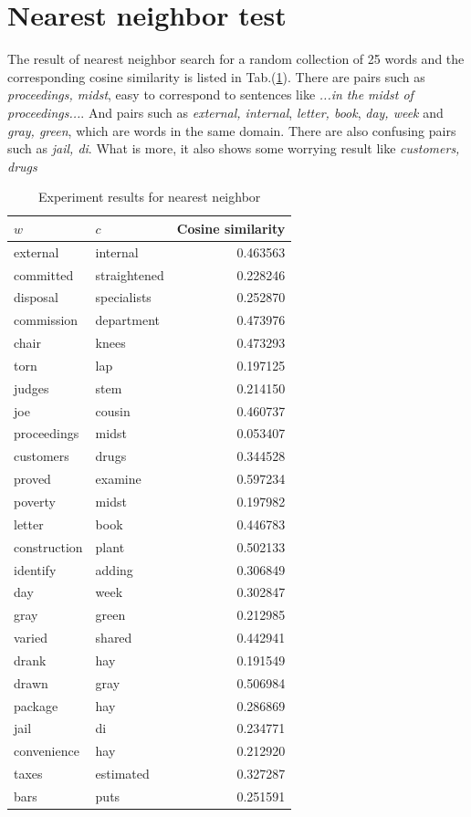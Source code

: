 \documentclass[12pt]{article}
\begin{document}
\section{Nearest neighbor test}
The result of nearest neighbor search for a random collection of 25 words and the corresponding cosine similarity is listed in Tab.(\ref{tab1}).
There are pairs such as \textit {proceedings, midst}, easy to correspond to sentences like \textit {...in the midst of proceedings...}. And pairs such as \textit {external, internal}, \textit {letter, book}, \textit {day, week} and \textit {gray, green}, which are words in the same domain. There are also confusing pairs such as \textit {jail, di}. What is more, it also shows some worrying result like \textit {customers, drugs}
\begin{table}[!h]
\centering
\caption{Experiment results for nearest neighbor}
\label{tab1}
\begin{tabular}{llr}

$w$    & $c$ & Cosine similarity  \\
\hline
external        &internal        &0.463563\\
committed      & straightened  &  0.228246\\
disposal     &   specialists    & 0.252870\\
commission  &    department    &  0.473976\\
chair       &    knees     &      0.473293\\
torn        &    lap         &    0.197125\\
judges       &   stem         &   0.214150\\
joe         &    cousin     &     0.460737\\
proceedings    & midst      &     0.053407\\
customers   &    drugs      &     0.344528\\
proved     &     examine       &  0.597234\\
poverty    &     midst        &   0.197982\\
letter       &   book         &   0.446783\\
construction   & plant    &       0.502133\\
identify     &   adding    &      0.306849\\
day        &     week       &     0.302847\\
gray        &    green    &       0.212985\\
varied  &        shared     &     0.442941\\
drank    &       hay      &       0.191549\\
drawn    &       gray      &      0.506984\\
package    &     hay        &     0.286869\\
jail        &    di         &     0.234771\\
convenience  &   hay      &       0.212920\\
taxes      &     estimated      & 0.327287\\
bars        &    puts     &       0.251591\\
\hline
\end{tabular}
\end{table}
\end{document}
